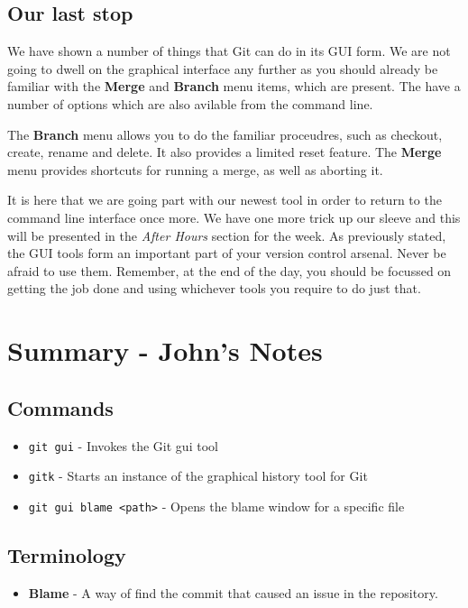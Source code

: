\subsection{Our last stop}
We have shown a number of things that Git can do in its GUI form.  We are not going to dwell on the graphical interface any further as you should already be familiar with the \textbf{Merge} and \textbf{Branch} menu items, which are present.  The have a number of options which are also avilable from the command line.  

The \textbf{Branch} menu allows you to do the familiar proceudres, such as checkout, create, rename and delete.  It also provides a limited reset feature.  The \textbf{Merge} menu provides shortcuts for running a merge, as well as aborting it.  

It is here that we are going part with our newest tool in order to return to the command line interface once more.  We have one more trick up our sleeve and this will be presented in the \emph{After Hours} section for the week.  As previously stated, the GUI tools form an important part of your version control arsenal.  Never be afraid to use them.  Remember, at the end of the day, you should be focussed on getting the job done and using whichever tools you require to do just that.

\clearpage

\section{Summary - John's Notes}
\subsection{Commands}
\begin{itemize}

\item\texttt{git gui} - Invokes the Git gui tool

\item\texttt{gitk} - Starts an instance of the graphical history tool for Git

\item\texttt{git gui blame <path>} - Opens the blame window for a specific file

\end{itemize}

\subsection{Terminology}
\begin{itemize}

\item\textbf{Blame} - A way of find the commit that caused an issue in the repository.
\end{itemize}
